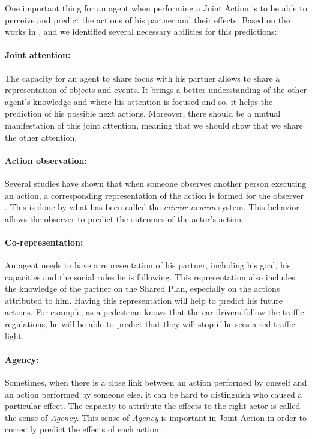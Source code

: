 \documentclass[english,a4paper,11pt,twoside]{StyleThese}
\begin{document}
\label{subsec:prediction}

One important thing for an agent when performing a Joint Action is to be able to perceive and predict the actions of his partner and their effects. Based on the works in \cite{sebanz2006joint}, \cite{pacherie2011phenomenology} and \cite{obhi2011moving} we identified several necessary abilities for this predictions:

\paragraph{Joint attention:} The capacity for an agent to share focus with his partner allows to share a representation of objects and events. It brings a better understanding of the other agent's knowledge and where his attention is focused and so, it helps the prediction of his possible next actions. Moreover, there should be a mutual manifestation of this joint attention, meaning that we should show that we share the other attention. 

\paragraph{Action observation:} Several studies have shown that when someone observes another person executing an action, a corresponding representation of the action is formed for the observer \cite{rizzolatti2004mirror}. This is done by what has been called the \textit{mirror-neuron} system. This behavior allows the observer to predict the outcomes of the actor's action. 

\paragraph{Co-representation:} An agent needs to have a representation of his partner, including his goal, his capacities and the social rules he is following. This representation also includes the knowledge of the partner on the Shared Plan, especially on the actions attributed to him. Having this representation will help to predict his future actions. For example, as a pedestrian knows that the car drivers follow the traffic regulations, he will be able to predict that they will stop if he sees a red traffic light.

\paragraph{Agency:} Sometimes, when there is a close link between an action performed by oneself and an action performed by someone else, it can be hard to distinguish who caused a particular effect. The capacity to attribute the effects to the right actor is called the sense of \textit{Agency}. This sense of \textit{Agency} is important in Joint Action in order to correctly predict the effects of each action.
\end{document}
